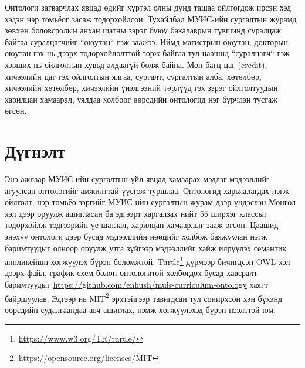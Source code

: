 \documentclass[conference, a4paper, mongolian]{myIEEEtran}
\begin{document}
Онтологи загварчлах явцад өдийг хүртэл олны дунд ташаа ойлгогдож ирсэн хэд хэдэн нэр томьёог засаж тодорхойлсон. Тухайлбал МУИС-ийн сургалтын журамд зөвхөн боловсролын анхан шатны зэрэг буюу бакалаврын түвшинд суралцаж байгаа суралцагчийг ``оюутан`` гэж заажээ. Иймд магистрын оюутан, докторын оюутан гэх нь дээрх тодорхойлолттой зөрж байгаа тул цаашид ``суралцагч`` гэж хэвших нь ойлголтын хувьд алдаагүй болж байна. Мөн багц цаг (credit), хичээлийн цаг гэх ойлголтын ялгаа, сургалт, сургалтын алба, хөтөлбөр, хичээлийн хөтөлбөр, хичээлийн үнэлгээний төрлүүд гэх зэрэг ойлголтуудын харилцан хамаарал, уялдаа холбоог өөрсдийн онтологид нэг бүрчлэн тусгаж өгсөн.
%
\section{Дүгнэлт}
%
Энэ ажлаар МУИС-ийн сургалтын үйл явцад хамаарах мэдлэг мэдээллийг агуулсан онтологийг амжилттай үүсгэж туршлаа. Онтологид харьяалагдах нэгж ойлголт, нэр томьёо зэргийг МУИС-ийн сургалтын журам дээр үндэслэн Монгол хэл дээр оруулж ашигласан ба эдгээрт харгалзах нийт 56 ширхэг классыг тодорхойлж тэдгээрийн үе шатлал, харилцан хамаарлыг зааж өгсөн. Цаашид энэхүү онтологи дээр бусад мэдээллийн нөөцийг холбож баяжуулан нэгж баримтуудыг олноор оруулж утга зүйгээр мэдээллийг хайж илрүүлэх семантик аппликейшн хөгжүүлэх бүрэн боломжтой. Turtle\footnote{\url{https://www.w3.org/TR/turtle/}} дүрмээр бичигдсэн OWL хэл дээрх файл, график схем болон онтологитой холбогдох бусад хавсралт баримтуудыг \url{https://github.com/enhush/muis-curriculum-ontology} хаягт байршуулав. Эдгээр нь MIT\footnote{\url{https://opensource.org/licenses/MIT}} эрхтэйгээр тавигдсан тул сонирхсон хэн бүхэнд өөрсдийн судалгаандаа авч ашиглах, нэмж хөгжүүлэхэд бүрэн нээлттэй юм.
%
\end{document}
